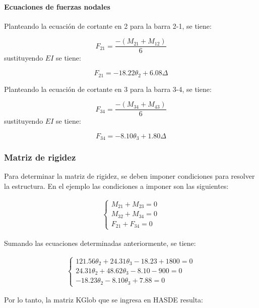 \paragraph{Ecuaciones de fuerzas nodales}

Planteando la ecuación de cortante en 2 para la barra 2-1, se tiene:

$$
F_{21} = \frac{-(M_{21}+M_{12})}{6}
$$
sustituyendo $EI$ se tiene:

\begin{equation}
\boxed{
	F_{21} = -18.22 \theta_2 + 6.08 \Delta
}
\end{equation}

Planteando la ecuación de cortante en 3 para la barra 3-4, se tiene:

$$
F_{34} = \frac{-(M_{34}+M_{43})}{6}
$$
sustituyendo $EI$ se tiene:

\begin{equation}
\boxed{
	F_{34} = -8.10 \theta_3 + 1.80 \Delta
}
\end{equation}

\subsubsection{Matriz de rigidez}

Para determinar la matriz de rigidez, se deben imponer condiciones para resolver la estructura. En el ejemplo las condiciones a imponer son las siguientes:


\begin{eqnarray}
	\left\lbrace 
	\begin{array}{l}
	M_{21}+M_{23} = 0 \\
	M_{32}+M_{34} = 0 \\
	F_{21}+F_{34} = 0
	\end{array}
\end{eqnarray}

Sumando las ecuaciones determinadas anteriormente, se tiene:

\begin{eqnarray}
	\left\lbrace 
	\begin{array}{l}
	121.56 \theta_{2} + 24.31 \theta_{3} -18.23 +1800 = 0\\
	24.31 \theta_{2} + 48.62 \theta_{3} -8.10 -900  = 0\\
	-18.23 \theta_{2} -8.10 \theta_{3} +7.88 = 0
	\end{array}
\end{eqnarray}

Por lo tanto, la matriz KGlob que se ingresa en HASDE resulta:


